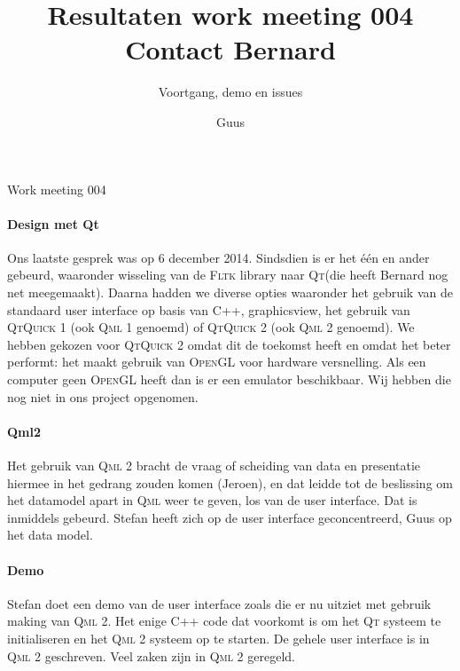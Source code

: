 \documentclass[a4paper,final]{article}
\title{Resultaten work meeting 004 Contact Bernard }
\author{Guus}
\begin{document}

\newcommand{\Noc}{\textsc{NoC}\xspace}
\newcommand{\w}[1]{\textsc{#1}\xspace}
\newcommand{\qml}{\textsc{Qml}\xspace}
\newcommand{\qt}{\textsc{Qt}\xspace}
\newcommand{\qtquick}{\textsc{QtQuick}\xspace}
\newcommand{\tv}{\textsc{TeamViewer}\xspace}
\newcommand{\cpp}{\textsc{C++}\xspace}
\newcommand{\fltk}{\textsc{Fltk}\xspace}
\newcommand{\ou}{\textsc{OU}\xspace}
\newcommand{\signal}{\textsc{signal}\xspace}
\newcommand{\slot}{\textsc{slot}\xspace}

\begin{Minutes}{Work meeting 004}
\subtitle{Voortgang, demo en issues}

\maketitle%


\paragraph{Design met Qt} Ons laatste gesprek was op 6 december 2014. Sindsdien
is er het \'e\'en en ander gebeurd, waaronder wisseling van de \fltk library naar
\qt (die heeft Bernard nog net meegemaakt). Daarna hadden we diverse opties waaronder 
het gebruik van de standaard user interface op basis van \cpp, graphicsview, 
het gebruik van \qtquick1 (ook \qml1 genoemd) of \qtquick2 (ook \qml2 genoemd).
We hebben gekozen voor \qtquick2 omdat dit de toekomst heeft en omdat het beter
performt: het maakt gebruik van \textsc{OpenGL} voor hardware versnelling. Als een
computer geen \textsc{OpenGL} heeft dan is er een emulator beschikbaar. Wij hebben
die nog niet in ons project opgenomen.

\paragraph{Qml2} Het gebruik van \qml2 bracht de vraag of scheiding van data 
en presentatie hiermee in het gedrang zouden komen (Jeroen), en dat leidde tot 
de beslissing om het datamodel apart in \qml weer te geven, los van de user interface.
Dat is inmiddels gebeurd. Stefan heeft zich op de user interface geconcentreerd, Guus op
het data model.

\paragraph{Demo} Stefan doet een demo van de user interface zoals die er nu uitziet
met gebruik making van \qml2. Het enige \cpp code dat voorkomt is om het \qt systeem
te initialiseren en het \qml2 systeem op te starten. De gehele user interface is in 
\qml2 geschreven. Veel zaken zijn in \qml2 geregeld.


\end{Minutes}
\end{document}
